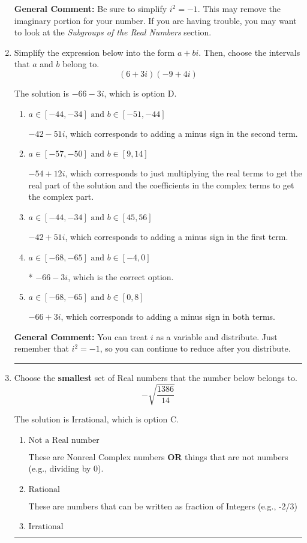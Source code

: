\documentclass{extbook}[14pt]
\newcommand{\litem}[1]{\item #1

\rule{\textwidth}{0.4pt}}
\begin{document}
\begin{enumerate}
{\textbf{General Comment:} Be sure to simplify $i^2 = -1$. This may remove the imaginary portion for your number. If you are having trouble, you may want to look at the \textit{Subgroups of the Real Numbers} section.
}
\litem{
Simplify the expression below into the form $a+bi$. Then, choose the intervals that $a$ and $b$ belong to.
\[ (6 + 3 i)(-9 + 4 i) \]

The solution is \( -66 - 3 i \), which is option D.\begin{enumerate}[label=\Alph*.]
\item \( a \in [-44, -34] \text{ and } b \in [-51, -44] \)

 $-42 - 51 i$, which corresponds to adding a minus sign in the second term.
\item \( a \in [-57, -50] \text{ and } b \in [9, 14] \)

 $-54 + 12 i$, which corresponds to just multiplying the real terms to get the real part of the solution and the coefficients in the complex terms to get the complex part.
\item \( a \in [-44, -34] \text{ and } b \in [45, 56] \)

 $-42 + 51 i$, which corresponds to adding a minus sign in the first term.
\item \( a \in [-68, -65] \text{ and } b \in [-4, 0] \)

* $-66 - 3 i$, which is the correct option.
\item \( a \in [-68, -65] \text{ and } b \in [0, 8] \)

 $-66 + 3 i$, which corresponds to adding a minus sign in both terms.
\end{enumerate}

\textbf{General Comment:} You can treat $i$ as a variable and distribute. Just remember that $i^2=-1$, so you can continue to reduce after you distribute.
}
\litem{
Choose the \textbf{smallest} set of Real numbers that the number below belongs to.
\[ -\sqrt{\frac{1386}{14}} \]

The solution is \( \text{Irrational} \), which is option C.\begin{enumerate}[label=\Alph*.]
\item \( \text{Not a Real number} \)

These are Nonreal Complex numbers \textbf{OR} things that are not numbers (e.g., dividing by 0).
\item \( \text{Rational} \)

These are numbers that can be written as fraction of Integers (e.g., -2/3)
\item \( \text{Irrational} \)


\end{enumerate}}
\end{enumerate}
\end{document}
